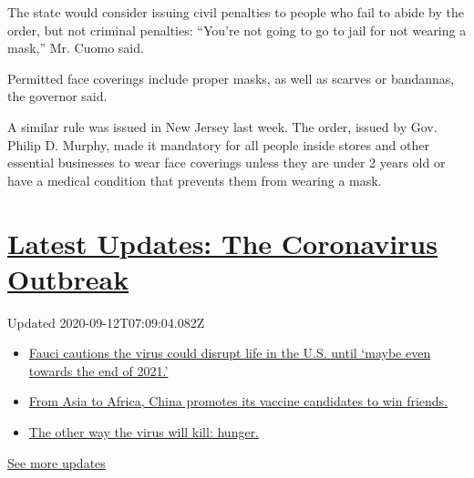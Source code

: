 The state would consider issuing civil penalties to people who fail to
abide by the order, but not criminal penalties: ``You're not going to go
to jail for not wearing a mask,'' Mr. Cuomo said.

Permitted face coverings include proper masks, as well as scarves or
bandannas, the governor said.

A similar rule was issued in New Jersey last week. The order, issued by
Gov. Philip D. Murphy, made it mandatory for all people inside stores
and other essential businesses to wear face coverings unless they are
under 2 years old or have a medical condition that prevents them from
wearing a mask.

\hypertarget{latest-updates-the-coronavirus-outbreak}{%
\section{\texorpdfstring{\href{https://www.nytimes3xbfgragh.onion/2020/09/11/world/covid-19-coronavirus.html?action=click\&pgtype=Article\&state=default\&region=MAIN_CONTENT_1\&context=storylines_live_updates}{Latest
Updates: The Coronavirus
Outbreak}}{Latest Updates: The Coronavirus Outbreak}}\label{latest-updates-the-coronavirus-outbreak}}

Updated 2020-09-12T07:09:04.082Z

\begin{itemize}
\tightlist
\item
  \href{https://www.nytimes3xbfgragh.onion/2020/09/11/world/covid-19-coronavirus.html?action=click\&pgtype=Article\&state=default\&region=MAIN_CONTENT_1\&context=storylines_live_updates\#link-dfb8a16}{Fauci
  cautions the virus could disrupt life in the U.S. until `maybe even
  towards the end of 2021.'}
\item
  \href{https://www.nytimes3xbfgragh.onion/2020/09/11/world/covid-19-coronavirus.html?action=click\&pgtype=Article\&state=default\&region=MAIN_CONTENT_1\&context=storylines_live_updates\#link-7104d154}{From
  Asia to Africa, China promotes its vaccine candidates to win friends.}
\item
  \href{https://www.nytimes3xbfgragh.onion/2020/09/11/world/covid-19-coronavirus.html?action=click\&pgtype=Article\&state=default\&region=MAIN_CONTENT_1\&context=storylines_live_updates\#link-393ad215}{The
  other way the virus will kill: hunger.}
\end{itemize}

\href{https://www.nytimes3xbfgragh.onion/2020/09/11/world/covid-19-coronavirus.html?action=click\&pgtype=Article\&state=default\&region=MAIN_CONTENT_1\&context=storylines_live_updates}{See
more updates}

